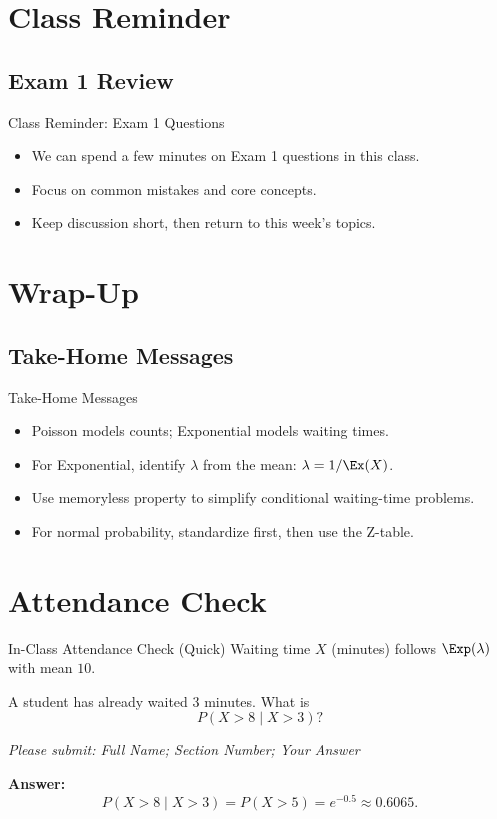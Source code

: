 \documentclass[aspectratio=169]{beamer}
\begin{document}
\section{Class Reminder}

\subsection{Exam 1 Review}
\begin{frame}{Class Reminder: Exam 1 Questions}
  \begin{itemize}
    \item We can spend a few minutes on Exam 1 questions in this class.
    \item Focus on common mistakes and core concepts.
    \item Keep discussion short, then return to this week's topics.
  \end{itemize}
\end{frame}

\section{Wrap-Up}

\subsection{Take-Home Messages}
\begin{frame}{Take-Home Messages}
  \begin{itemize}
    \item Poisson models counts; Exponential models waiting times.
    \item For Exponential, identify \(\lambda\) from the mean: \(\lambda=1/\Ex(X)\).
    \item Use memoryless property to simplify conditional waiting-time problems.
    \item For normal probability, standardize first, then use the Z-table.
  \end{itemize}
\end{frame}

\section{Attendance Check}

\begin{frame}{In-Class Attendance Check (Quick)}
  Waiting time \(X\) (minutes) follows \(\Exp(\lambda)\) with mean \(10\).

  A student has already waited 3 minutes.
  What is
  \[
    P(X>8\mid X>3)?
  \]

  \vspace{3mm}
  \textit{Please submit: Full Name; Section Number; Your Answer}

  \pause
  \vspace{2mm}
  \textbf{Answer:}
  \[
    P(X>8\mid X>3)=P(X>5)=e^{-0.5}\approx 0.6065.
  \]
\end{frame}
\end{document}
